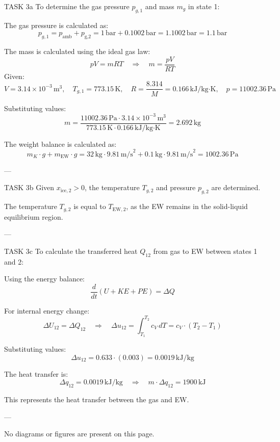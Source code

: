TASK 3a  
To determine the gas pressure \( p_{g,1} \) and mass \( m_g \) in state 1:  

The gas pressure is calculated as:  
\[
p_{g,1} = p_{\text{amb}} + p_{\text{g,2}} = 1 \, \text{bar} + 0.1002 \, \text{bar} = 1.1002 \, \text{bar} = 1.1 \, \text{bar}
\]  

The mass is calculated using the ideal gas law:  
\[
p V = m R T \quad \Rightarrow \quad m = \frac{p V}{R T}
\]  
Given:  
\[
V = 3.14 \times 10^{-3} \, \text{m}^3, \quad T_{g,1} = 773.15 \, \text{K}, \quad R = \frac{8.314}{M} = 0.166 \, \text{kJ/kg·K}, \quad p = 11002.36 \, \text{Pa}
\]  

Substituting values:  
\[
m = \frac{11002.36 \, \text{Pa} \cdot 3.14 \times 10^{-3} \, \text{m}^3}{773.15 \, \text{K} \cdot 0.166 \, \text{kJ/kg·K}} = 2.692 \, \text{kg}
\]  

The weight balance is calculated as:  
\[
m_K \cdot g + m_{\text{EW}} \cdot g = 32 \, \text{kg} \cdot 9.81 \, \text{m/s}^2 + 0.1 \, \text{kg} \cdot 9.81 \, \text{m/s}^2 = 1002.36 \, \text{Pa}
\]  

---

TASK 3b  
Given \( x_{\text{ice},2} > 0 \), the temperature \( T_{g,2} \) and pressure \( p_{g,2} \) are determined.  

The temperature \( T_{g,2} \) is equal to \( T_{\text{EW},2} \), as the EW remains in the solid-liquid equilibrium region.  

---

TASK 3c  
To calculate the transferred heat \( Q_{12} \) from gas to EW between states 1 and 2:  

Using the energy balance:  
\[
\frac{d}{dt} \left( U + KE + PE \right) = \Delta Q
\]  

For internal energy change:  
\[
\Delta U_{12} = \Delta Q_{12} \quad \Rightarrow \quad \Delta u_{12} = \int_{T_1}^{T_2} c_V \, dT = c_V \cdot (T_2 - T_1)
\]  

Substituting values:  
\[
\Delta u_{12} = 0.633 \cdot (0.003) = 0.0019 \, \text{kJ/kg}
\]  

The heat transfer is:  
\[
\Delta q_{12} = 0.0019 \, \text{kJ/kg} \quad \Rightarrow \quad m \cdot \Delta q_{12} = 1900 \, \text{kJ}
\]  

This represents the heat transfer between the gas and EW.  

---

No diagrams or figures are present on this page.